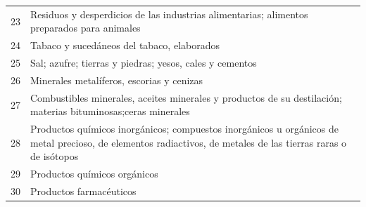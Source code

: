 \documentclass[a4paper,openright,12pt]{book}
\begin{document}
\begin{table}[]
{\begin{tabular}{@{}ll@{}}
23  & Residuos y desperdicios de las industrias alimentarias; alimentos preparados para animales                                                                                                                                                                                                     \\
24  & Tabaco y sucedáneos del tabaco, elaborados                                                                                                                                                                                                                                                     \\
25  & Sal; azufre; tierras y piedras; yesos, cales y cementos                                                                                                                                                                                                                                        \\
26  & Minerales metalíferos, escorias y cenizas                                                                                                                                                                                                                                                      \\
27  & Combustibles minerales, aceites minerales y productos de su destilación; materias bituminosas;ceras minerales                                                                                                                                                                                  \\
28  & Productos químicos inorgánicos; compuestos inorgánicos u orgánicos de metal precioso, de elementos radiactivos, de metales de las tierras raras o de isótopos                                                                                                                                  \\
29  & Productos químicos orgánicos                                                                                                                                                                                                                                                                   \\
30  & Productos farmacéuticos                                                                                                                                                                                                                                                                        \\

\end{tabular}}
\end{table}
\end{document}
